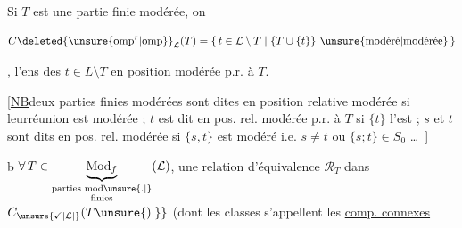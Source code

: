 


Si $T$ est une partie finie
modérée\unsure{,|;}, on  

\[
 C\deleted{\unsure{\mathrm{omp}^{r}|\mathrm{omp}}}_{\mathcal L}(T)=
 \{\,t\in\mathcal L\setminus T\mid \{T\cup\{t\}\}\ \text{\unsure{modéré|modérée}}\,\}
\]


, l'ens des $t\in L\setminus T$ en
position modérée p.r. à $T$.

[\uline{NB}\quad deux parties finies modérées
sont dites en position relative
modérée si leur\unsure{-| }réunion est
modérée ; $t$ est dit en pos. rel.
modérée p.r. à $T$ si $\{t\}$ l'est ;
$s$ et $t$ sont dits en pos. rel. modérée
si $\{s,t\}$ est modéré i.e. \unsure{,}
$s\ne t$ ou $\{s;t\}\in S_0$ \ldots\ ]


\textcircled{\scriptsize b}\quad $\forall\,T\in\underbrace{\mathrm{Mod}_{f}}_{\substack{\text{parties mod\unsure{.|}}\\\text{finies}}}(\mathcal L)$, une relation
d'équivalence $\mathcal R_T$ dans $C_{\unsure{\checkmark|\mathcal L|}}(T\unsure{)|\}}$ (dont
les classes s'appellent les \uline{comp. connexes} 


